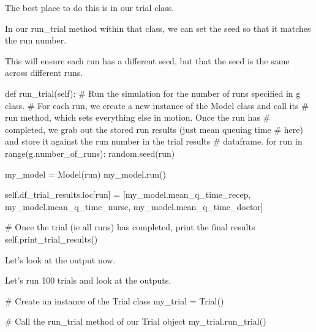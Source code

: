 \documentclass[
  letterpaper,
  DIV=11,
  numbers=noendperiod]{scrreprt}
\newenvironment{Shaded}{}{}
\newcommand{\BuiltInTok}[1]{\textcolor[rgb]{0.84,0.23,0.29}{#1}}
\newcommand{\CommentTok}[1]{\textcolor[rgb]{0.42,0.45,0.49}{#1}}
\newcommand{\ControlFlowTok}[1]{\textcolor[rgb]{0.84,0.23,0.29}{#1}}
\newcommand{\KeywordTok}[1]{\textcolor[rgb]{0.84,0.23,0.29}{#1}}
\newcommand{\NormalTok}[1]{\textcolor[rgb]{0.14,0.16,0.18}{#1}}
\newcommand{\OperatorTok}[1]{\textcolor[rgb]{0.14,0.16,0.18}{#1}}
\newcommand{\VariableTok}[1]{\textcolor[rgb]{0.89,0.38,0.04}{#1}}
\begin{document}
The best place to do this is in our trial class.

In our run\_trial method within that class, we can set the seed so that
it matches the run number.

This will ensure each run has a different seed, but that the seed is the
same across different runs.

\begin{Shaded}
\begin{Highlighting}[]
\KeywordTok{def}\NormalTok{ run\_trial(}\VariableTok{self}\NormalTok{):}
    \CommentTok{\# Run the simulation for the number of runs specified in g class.}
    \CommentTok{\# For each run, we create a new instance of the Model class and call its}
    \CommentTok{\# run method, which sets everything else in motion.  Once the run has}
    \CommentTok{\# completed, we grab out the stored run results (just mean queuing time}
    \CommentTok{\# here) and store it against the run number in the trial results}
    \CommentTok{\# dataframe.}
    \ControlFlowTok{for}\NormalTok{ run }\KeywordTok{in} \BuiltInTok{range}\NormalTok{(g.number\_of\_runs):}
\NormalTok{        random.seed(run)}

\NormalTok{        my\_model }\OperatorTok{=}\NormalTok{ Model(run)}
\NormalTok{        my\_model.run()}

        \VariableTok{self}\NormalTok{.df\_trial\_results.loc[run] }\OperatorTok{=}\NormalTok{ [my\_model.mean\_q\_time\_recep,}
\NormalTok{                                          my\_model.mean\_q\_time\_nurse,}
\NormalTok{                                          my\_model.mean\_q\_time\_doctor]}

    \CommentTok{\# Once the trial (ie all runs) has completed, print the final results}
    \VariableTok{self}\NormalTok{.print\_trial\_results()}
\end{Highlighting}
\end{Shaded}

Let's look at the output now.

Let's run 100 trials and look at the outputs.

\begin{Shaded}
\begin{Highlighting}[]
\CommentTok{\# Create an instance of the Trial class}
\NormalTok{my\_trial }\OperatorTok{=}\NormalTok{ Trial()}

\CommentTok{\# Call the run\_trial method of our Trial object}
\NormalTok{my\_trial.run\_trial()}
\end{Highlighting}
\end{Shaded}
\end{document}
